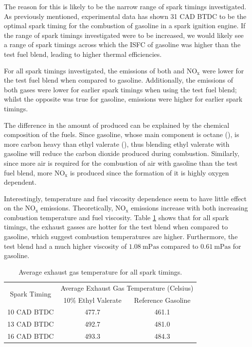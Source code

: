 \documentclass[11pt]{article}
\begin{document}
The reason for this is likely to be the narrow range of spark timings investigated. As previously mentioned, experimental data has shown 31 CAD BTDC to be the optimal spark timing for the combustion of gasoline in a spark ignition engine. If the range of spark timings investigated were to be increased, we would likely see a range of spark timings across which the ISFC of gasoline was higher than the test fuel blend, leading to higher thermal efficiencies. 

For all spark timings investigated, the emissions of both  and $\text{NO}_{\text{x}}$ were lower for the test fuel blend when compared to gasoline. Additionally, the emissions of both gases were lower for earlier spark timings when using the test fuel blend; whilst the opposite was true for gasoline, emissions were higher for earlier spark timings.

The difference in the amount of  produced can be explained by the chemical composition of the fuels. Since gasoline, whose main component is octane (), is more carbon heavy than ethyl valerate (), thus blending ethyl valerate with gasoline will reduce the carbon dioxide produced during combustion. Similarly, since more air is required for the combustion of air with gasoline than the test fuel blend, more $\text{NO}_{\text{x}}$ is produced since the formation of it is highly oxygen dependent. 

Interestingly, temperature and fuel viscosity dependence seem to have little effect on the $\text{NO}_{\text{x}}$ emissions. Theoretically, $\text{NO}_{\text{x}}$ emissions increase with both increasing combustion temperature and fuel viscosity. Table \ref{q7-t1} shows that for all spark timings, the exhaust gasses are hotter for the test blend when compared to gasoline, which suggest combustion temperatures are higher. Furthermore, the test blend had a much higher viscosity of $\SI{1.08}{\milli\pascal\second}$ compared to $\SI{0.61}{\milli\pascal\second}$ for gasoline. 

\begin{table}[H]
	\begin{center}
	\begin{tabular}{c c c}
		\toprule
		\multirow{2}{*}{Spark Timing} & \multicolumn{2}{c}{Average Exhaust Gas Temperature (Celsius)} \\
		\cmidrule{2-3} & 10\% Ethyl Valerate & Reference Gasoline \\
		\midrule
		10 CAD BTDC & 477.7 & 461.1 \\
		\midrule
		13 CAD BTDC & 492.7 & 481.0 \\
		\midrule
		16 CAD BTDC & 493.3 & 484.3 \\
		\bottomrule
	\end{tabular}
	\caption{Average exhaust gas temperature for all spark timings.}
	\label{q7-t1}
	\end{center}
\end{table}
\end{document}
